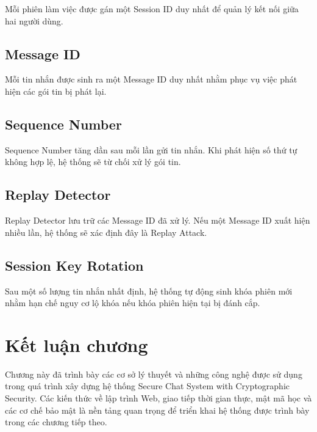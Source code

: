 Mỗi phiên làm việc được gán một Session ID duy nhất để quản lý kết nối giữa hai người dùng.

\subsection{Message ID}

Mỗi tin nhắn được sinh ra một Message ID duy nhất nhằm phục vụ việc phát hiện các gói tin bị phát lại.

\subsection{Sequence Number}

Sequence Number tăng dần sau mỗi lần gửi tin nhắn. Khi phát hiện số thứ tự không hợp lệ, hệ thống sẽ từ chối xử lý gói tin.

\subsection{Replay Detector}

Replay Detector lưu trữ các Message ID đã xử lý. Nếu một Message ID xuất hiện nhiều lần, hệ thống sẽ xác định đây là Replay Attack.

\subsection{Session Key Rotation}

Sau một số lượng tin nhắn nhất định, hệ thống tự động sinh khóa phiên mới nhằm hạn chế nguy cơ lộ khóa nếu khóa phiên hiện tại bị đánh cắp.

\section{Kết luận chương}

Chương này đã trình bày các cơ sở lý thuyết và những công nghệ được sử dụng trong quá trình xây dựng hệ thống Secure Chat System with Cryptographic Security. Các kiến thức về lập trình Web, giao tiếp thời gian thực, mật mã học và các cơ chế bảo mật là nền tảng quan trọng để triển khai hệ thống được trình bày trong các chương tiếp theo.
